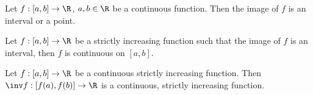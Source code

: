 \documentclass{article}
\begin{document}
\setcounter{theorem}{8}
\begin{theorem}
    Let $f:[a,b]\to\R$, $a,b\in\R$ be a continuous function. Then the
    image of $f$ is an interval or a point.
\end{theorem}

\begin{theorem}
    Let $f:[a,b]\to\R$ be a strictly increasing function such that
    the image of $f$ is an interval, then $f$ is continuous on $[a,b]$.
\end{theorem}

\begin{theorem}
    Let $f:[a,b]\to\R$ be a continuous strictly increasing function.
    Then $\inv f:[f(a),f(b)]\to\R$ is a continuous, strictly increasing
    function.
\end{theorem}
\end{document}
